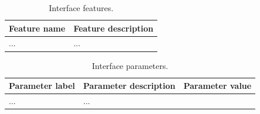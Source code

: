 
\begin{table}[ht]
\caption{Interface features.} \label{tab:interface_features}
\begin{tabular}{l | p{13cm}}
	\toprule
	Feature name & Feature description \\
	\midrule
	... & ... \\
	\bottomrule
\end{tabular}
\end{table}


\begin{table}[ht]
\caption{Interface parameters.} \label{tab:interface_parameters}
\begin{tabular}{l | l | l}
	\toprule
	Parameter label & Parameter description & Parameter value \\
	\midrule
	... & ... \\
	\bottomrule
\end{tabular}
\end{table}
